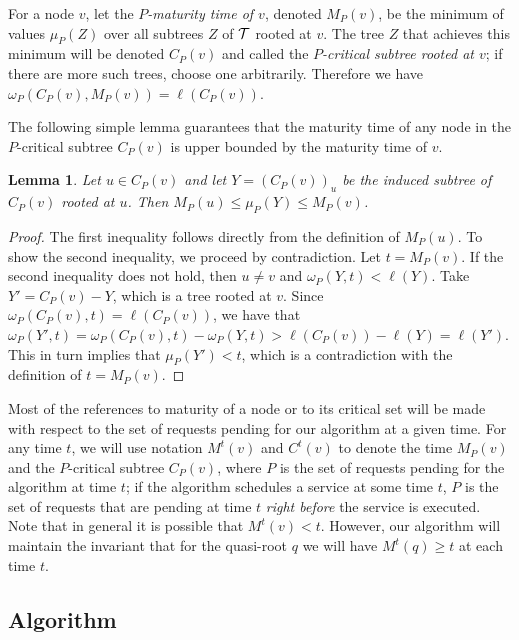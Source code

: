 \documentclass[a4paper]{article}
\newtheorem{lemma}[theorem]{Lemma}
\newcommand{\calT}{{\cal T}}
\newcommand{\length}{\ell}
\newcommand{\treematurity}{\mu}
\newcommand{\vertmaturity}{M}
\begin{document}
For a node $v$, let the \emph{$P$-maturity time of $v$}, denoted
$\vertmaturity_P(v)$, be the minimum of values $\treematurity_P(Z)$
over all subtrees $Z$ of $\calT$ rooted at $v$.  The tree $Z$ that
achieves this minimum will be denoted $C_P(v)$ and called the
\emph{$P$-critical subtree rooted at $v$}; if there are more such trees,
choose one arbitrarily. Therefore we have
$\omega_P(C_P(v),\vertmaturity_P(v))=\length(C_P(v))$.

The following simple lemma guarantees that the maturity time of any
node in the $P$-critical subtree $C_P(v)$ is upper bounded by the maturity time of $v$.


\begin{lemma}
\label{lem: maturity-critical}
Let $u\in C_P(v)$ and let $Y =(C_P(v))_u$ be the induced subtree of 
$C_P(v)$ rooted at $u$. Then 
$\vertmaturity_P(u)\leq \treematurity_P(Y)\leq \vertmaturity_P(v)$.
\end{lemma}


\begin{proof}
The first inequality follows directly from the definition of $\vertmaturity_P(u)$. 
To show the second inequality, we proceed by contradiction. 
Let $t = \vertmaturity_P(v)$.
If the second inequality does not
hold, then $u\neq v$ and $\omega_P(Y,t)< \length(Y)$. 
Take $Y' = C_P(v) - Y$, which is a tree rooted at $v$.
Since $\omega_P(C_P(v),t)=\length(C_P(v))$, we have that 
$\omega_P(Y',t) = \omega_P(C_P(v),t) - \omega_P(Y,t)
	> \length(C_P(v)) - \length(Y)
	= \length(Y')$. 
This in turn implies that $\treematurity_P(Y') < t$, which is a
contradiction with the definition of $t = \vertmaturity_P(v)$.
\end{proof}

Most of the references to maturity of a node or to its critical set
will be made with respect to the set of requests pending for our
algorithm at a given time.  For any time $t$, we will use notation
$\vertmaturity^t(v)$ and $C^t(v)$ to denote the time
$\vertmaturity_P(v)$ and the $P$-critical subtree $C_P(v)$, where $P$
is the set of requests pending for the algorithm at time $t$; if the
algorithm schedules a service at some time $t$, $P$ is the set of
requests that are pending at time $t$ \emph{right before} the service
is executed. Note that in general it is possible that
$\vertmaturity^t(v)<t$. However, our algorithm will maintain the
invariant that for the quasi-root $q$ we will have
$\vertmaturity^t(q)\geq t$ at each time $t$.


\subsection{Algorithm}
\end{document}
